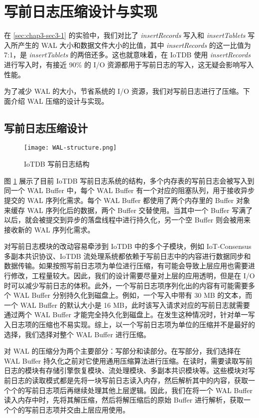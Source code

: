 \section{写前日志压缩设计与实现\label{sec:chap7-sec4}}
在 \ref{sec:chap3-sec3-1} 的实验中，我们对比了 \emph{insertRecords} 写入和 \emph{insertTablets} 写入所产生的 WAL 大小和数据文件大小的比值，其中 \emph{insertRecords} 的这一比值为 7:1，是 \emph{insertTablets} 的两倍还多。这也就意味着，在 IoTDB 使用 \emph{insertRecords} 进行写入时，有接近 90\% 的 I/O 资源都用于写前日志的写入，这无疑会影响写入性能。

为了减少 WAL 的大小，节省系统的 I/O 资源，我们对写前日志进行了压缩。下面介绍 WAL 压缩的设计与实现。
\subsection{写前日志压缩设计}
\begin{figure}
  \centering
  \texttt{[image: WAL-structure.png]}
  \caption{IoTDB 写前日志结构\cite{朱海铭2023面向内存表的可动态配置预写日志框架}}
  \label{fig:wal-compress-design}
\end{figure}

图 \ref{fig:wal-compress-design} 展示了目前 IoTDB 写前日志系统的结构，多个内存表的写前日志会被写入到同一个 WAL Buffer 中，每个 WAL Buffer 有一个对应的阻塞队列，用于接收异步提交的 WAL 序列化需求。每个 WAL Buffer 都使用了两个内存里的 Buffer 对象来缓存 WAL 序列化后的数据，两个 Buffer 交替使用。当其中一个 Buffer 写满了以后，就会被提交到异步的落盘线程中进行持久化，另一个空 Buffer 则会被用来接收新的 WAL 序列化需求。

对写前日志模块的改动容易牵涉到 IoTDB 中的多个子模块，例如 IoT-Consensus 多副本共识协议、IoTDB 流处理系统都依赖于写前日志中的内容进行数据同步和数据传输。如果按照写前日志项为单位进行压缩，有可能会导致上层应用也需要进行修改，工程量较大。因此，我们的设计需要尽量对上层的应用透明，但是在 I/O 时可以减少写前日志的体积。此外，一个写前日志项序列化出的内容有可能需要多个 WAL Buffer 分别持久化到磁盘上。例如，一个写入中带有 30 MB 的文本，而一个 WAL Buffer 的默认大小是 16 MB，此时该写入请求对应的写前日志就需要通过两个 WAL Buffer 才能完全持久化到磁盘上。在发生这种情况时，针对单一写入日志项的压缩也不易实现。综上，以一个写前日志项为单位的压缩并不是最好的选择，我们选择对整个 WAL Buffer 进行压缩。

对 WAL 的压缩分为两个主要部分：写部分和读部分。在写部分，我们选择在 WAL Buffer 持久化之前对它使用通用压缩算法进行压缩。在读时，需要读取写前日志的模块有存储引擎恢复模块、流处理模块、多副本共识模块等。这些模块对写前日志的读取模式都是先将一块写前日志读入内存，然后解析其中的内容，获取一个个的写前日志项后再继续处理其他上层逻辑。因此，我们在将一个 WAL Buffer 读入内存中时，先将其解压缩，然后将解压缩后的原始 Buffer 进行解析，获取一个个的写前日志项并交由上层应用使用。
